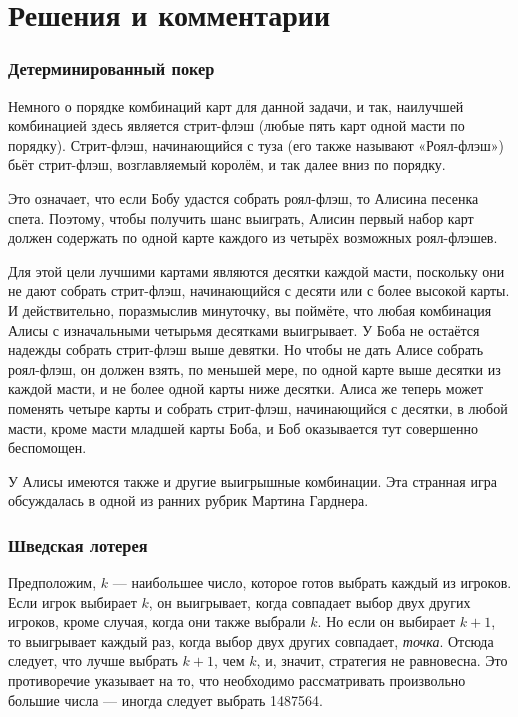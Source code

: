 \section*{Решения и комментарии}

\subsubsection*{Детерминированный покер}%

Немного о порядке комбинаций карт для данной задачи, и так, наилучшей комбинацией здесь является стрит-флэш (любые пять карт одной масти по порядку).
Стрит-флэш, начинающийся с туза (его также называют «Роял-флэш») бьёт стрит-флэш, возглавляемый королём, и так далее вниз по порядку.

Это означает, что если Бобу удастся собрать роял-флэш, то Алисина песенка спета.
Поэтому, чтобы получить шанс выиграть, Алисин первый набор карт должен содержать по одной карте каждого из четырёх возможных роял-флэшев.

Для этой цели лучшими картами являются десятки каждой масти, поскольку они не дают собрать стрит-флэш, начинающийся с десяти или с более высокой карты.
И действительно, поразмыслив минуточку, вы поймёте, что любая комбинация Алисы с изначальными четырьмя десятками выигрывает.
У Боба не остаётся надежды собрать стрит-флэш выше девятки.
Но чтобы не дать Алисе собрать роял-флэш, он должен взять, по меньшей мере, по одной карте выше десятки из каждой масти, и не более одной карты ниже десятки.
Алиса же теперь может поменять четыре карты и собрать стрит-флэш, начинающийся с десятки, в любой масти, кроме масти младшей карты Боба,
и Боб оказывается тут совершенно беспомощен.
\heart

У Алисы имеются также и другие выигрышные комбинации.
Эта странная игра обсуждалась в одной из ранних рубрик Мартина Гарднера. 

\subsubsection*{Шведская лотерея}%

Предположим, $k$ --- наибольшее число, которое готов выбрать каждый из игроков.
Если игрок выбирает $k$, он выигрывает, когда совпадает выбор двух других игроков, кроме случая, когда они также выбрали $k$.
Но если он выбирает $k+1$, то выигрывает каждый раз, когда выбор двух других совпадает, \emph{точка}.
Отсюда следует, что лучше выбрать $k+1$, чем $k$, и, значит, стратегия не равновесна.
Это противоречие указывает на то, что необходимо рассматривать произвольно большие числа --- иногда следует выбрать 1487564.
\heart

